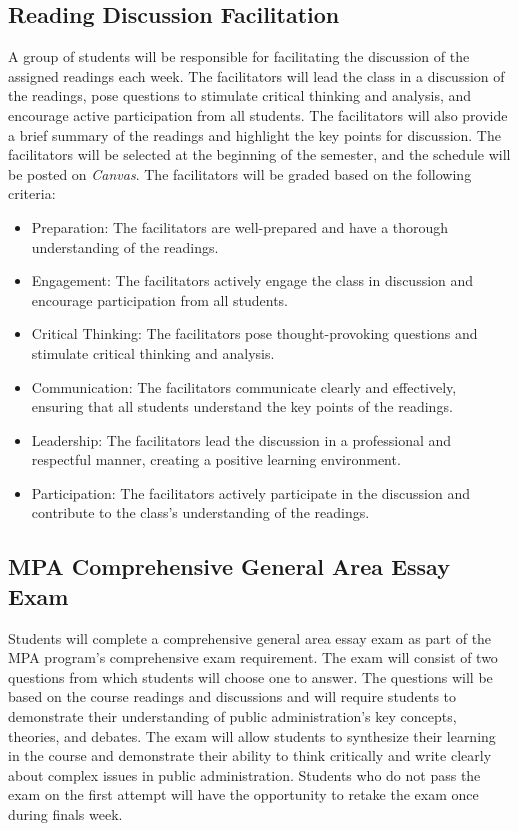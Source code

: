 \documentclass[12pt, letterpaper]{article}
\begin{document}
\subsection*{Reading Discussion Facilitation}
A group of students will be responsible for facilitating the discussion of the assigned readings each week. The facilitators will lead the class in a discussion of the readings, pose questions to stimulate critical thinking and analysis, and encourage active participation from all students. The facilitators will also provide a brief summary of the readings and highlight the key points for discussion. The facilitators will be selected at the beginning of the semester, and the schedule will be posted on \emph{Canvas}. The facilitators will be graded based on the following criteria:

\begin{itemize}
    \item Preparation: The facilitators are well-prepared and have a thorough understanding of the readings.
    \item Engagement: The facilitators actively engage the class in discussion and encourage participation from all students.
    \item Critical Thinking: The facilitators pose thought-provoking questions and stimulate critical thinking and analysis.
    \item Communication: The facilitators communicate clearly and effectively, ensuring that all students understand the key points of the readings.
    \item Leadership: The facilitators lead the discussion in a professional and respectful manner, creating a positive learning environment.
    \item Participation: The facilitators actively participate in the discussion and contribute to the class's understanding of the readings.
\end{itemize}

\subsection*{MPA Comprehensive General Area Essay Exam}

Students will complete a comprehensive general area essay exam as part of the MPA program's comprehensive exam requirement. The exam will consist of two questions from which students will choose one to answer. The questions will be based on the course readings and discussions and will require students to demonstrate their understanding of public administration's key concepts, theories, and debates. The exam will allow students to synthesize their learning in the course and demonstrate their ability to think critically and write clearly about complex issues in public administration. Students who do not pass the exam on the first attempt will have the opportunity to retake the exam once during finals week.
\end{document}
